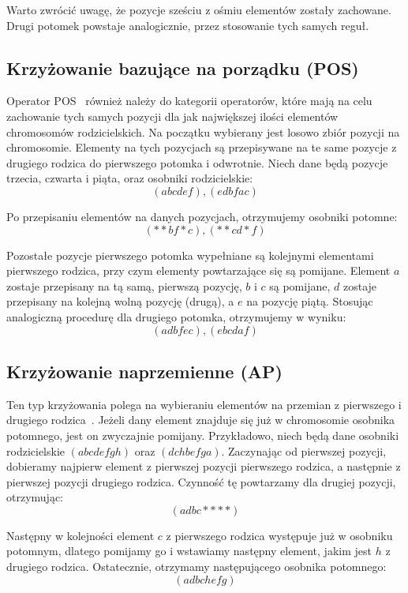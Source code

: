 \documentclass{xmgr}
\begin{document}
Warto zwrócić uwagę, że pozycje sześciu z ośmiu elementów zostały zachowane. Drugi potomek powstaje analogicznie, przez stosowanie tych samych reguł.


\subsection{Krzyżowanie bazujące na porządku (POS)}

Operator POS~\cite{Syswerda} również należy do kategorii operatorów, które mają na celu zachowanie tych samych pozycji dla jak największej ilości elementów chromosomów rodzicielskich. Na początku wybierany jest losowo zbiór pozycji na chromosomie. Elementy na tych pozycjach są przepisywane na te same pozycje z drugiego rodzica do pierwszego potomka i odwrotnie. Niech dane będą pozycje trzecia, czwarta i piąta, oraz osobniki rodzicielskie:
$$ (a b c d e f), (e d b f a c) $$

Po przepisaniu elementów na danych pozycjach, otrzymujemy osobniki potomne:
$$ (* * b f * c), (* * c d * f) $$

Pozostałe pozycje pierwszego potomka wypełniane są kolejnymi elementami pierwszego rodzica, przy czym elementy powtarzające się są pomijane. Element $a$ zostaje przepisany na tą samą, pierwszą pozycję, $b$ i $c$ są pomijane, $d$ zostaje przepisany na kolejną wolną pozycję (drugą), a $e$ na pozycję piątą. Stosując analogiczną procedurę dla drugiego potomka, otrzymujemy w wyniku:
$$ (a d b f e c), (e b c d a f) $$


\subsection{Krzyżowanie naprzemienne (AP)}

Ten typ krzyżowania polega na wybieraniu elementów na przemian z pierwszego i drugiego rodzica~\cite{Larranaga99geneticalgorithms}. Jeżeli dany element znajduje się już w chromosomie osobnika potomnego, jest on zwyczajnie pomijany. Przykładowo, niech będą dane osobniki rodzicielskie $(a b c d e f g h)$ oraz $(d c h b e f g a)$. Zaczynając od pierwszej pozycji, dobieramy najpierw element z pierwszej pozycji pierwszego rodzica, a następnie z pierwszej pozycji drugiego rodzica. Czynność tę powtarzamy dla drugiej pozycji, otrzymując:
$$ (a d b c * * * *) $$

Następny w kolejności element $c$ z pierwszego rodzica występuje już w osobniku potomnym, dlatego pomijamy go i wstawiamy następny element, jakim jest $h$ z drugiego rodzica. Ostatecznie, otrzymamy następującego osobnika potomnego:
$$ (a d b c h e f g) $$
\end{document}
